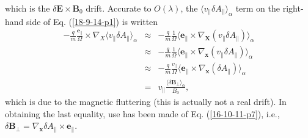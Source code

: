 \documentclass{llncs}
\begin{document}
which is the $\delta \mathbf{E} \times \mathbf{B}_0$ drift. Accurate to $O
(\lambda)$, the $\langle v_{\parallel} \delta A_{\parallel} \rangle_{\alpha}$
term on the right-hand side of Eq. (\ref{18-9-14-p1}) is written
\begin{eqnarray}
  - \frac{q}{m}  \frac{\mathbf{e}_{\parallel}}{\Omega} \times \nabla_X \langle
  v_{\parallel} \delta A_{\parallel} \rangle_{\alpha} & \approx & -
  \frac{q}{m} \frac{1}{\Omega} \langle \mathbf{e}_{\parallel} \times
  \nabla_{\mathbf{X}} (v_{\parallel} \delta A_{\parallel}) \rangle_{\alpha}
  \nonumber\\
  & \approx & - \frac{q}{m}  \frac{1}{\Omega} \langle \mathbf{e}_{\parallel}
  \times \nabla_{\mathbf{x}} (v_{\parallel} \delta A_{\parallel})
  \rangle_{\alpha} \nonumber\\
  & \approx & - \frac{q}{m} \frac{v_{\parallel}}{\Omega} \langle
  \mathbf{e}_{\parallel} \times \nabla_{\mathbf{x}} (\delta A_{\parallel})
  \rangle_{\alpha} \nonumber\\
  & = & v_{\parallel} \frac{\langle \delta \mathbf{B}_{\perp}
  \rangle_{\alpha}}{B_0},  \label{16-10-11-p10}
\end{eqnarray}
which is due to the magnetic fluttering (this is actually not a real drift).
In obtaining the last equality, use has been made of Eq. (\ref{16-10-11-p7}),
i.e., $\delta \mathbf{B}_{\perp} = \nabla_{\mathbf{x}} \delta A_{\parallel}
\times \mathbf{e}_{\parallel}$.
\end{document}
